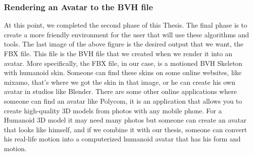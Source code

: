 \subsubsection*{Rendering an Avatar to the BVH file}

At this point, we completed the second phase of this Thesis. The final phase is to create a more friendly environment for the user that will use these algorithms and tools. The last image of the above figure is the desired output that we want, the FBX file. This file is the BVH file that we created when we render it into an avatar. More specifically, the FBX file, in our case, is a motioned BVH Skeleton with humanoid skin. Someone can find these skins on some online websites, like mixamo, that's where we got the skin in that image, or he can create his own avatar in studios like Blender. There are some other online applications where someone can find an avatar like Polycom, it is an application that allows you to create high-quality 3D models from photos with any mobile phone. For a Humanoid 3D model it may need many photos but someone can create an avatar that looks like himself, and if we combine it with our thesis, someone can convert his real-life motion into a computerized humanoid avatar that has his form and motion.